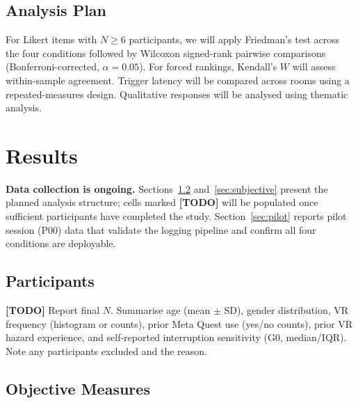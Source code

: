 \documentclass{styling/vgtc} %
\begin{document}
\subsection{Analysis Plan}

For Likert items with $N \geq 6$ participants, we will apply Friedman's
test across the four conditions followed by Wilcoxon signed-rank pairwise
comparisons (Bonferroni-corrected, $\alpha = 0.05$). For forced rankings,
Kendall's $W$ will assess within-sample agreement. Trigger latency will
be compared across rooms using a repeated-measures design. Qualitative
responses will be analysed using thematic analysis.


\section{Results}
\label{sec:results}

\textbf{Data collection is ongoing.} Sections~\ref{sec:objective}
and~\ref{sec:subjective} present the planned analysis structure; cells
marked \textbf{[TODO]} will be populated once sufficient participants
have completed the study. Section~\ref{sec:pilot} reports pilot session
(P00) data that validate the logging pipeline and confirm all four
conditions are deployable.

\subsection{Participants}

\textbf{[TODO]} Report final $N$. Summarise age (mean $\pm$ SD), gender
distribution, VR frequency (histogram or counts), prior Meta Quest use
(yes/no counts), prior VR hazard experience, and self-reported
interruption sensitivity (G0, median/IQR). Note any participants
excluded and the reason.


\subsection{Objective Measures}
\label{sec:objective}
\end{document}
